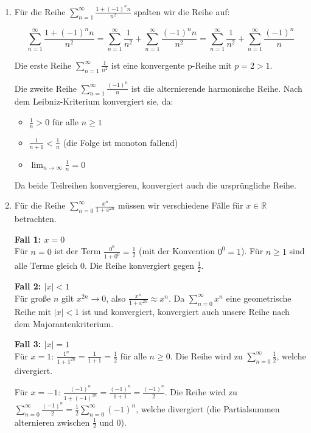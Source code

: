 \documentclass{article}
\begin{document}
\begin{enumerate}[label=(\alph*)]
\item Für die Reihe $\displaystyle \sum_{n=1}^\infty \frac{1 + (-1)^n n}{n^2}$ spalten wir die Reihe auf:

$$\sum_{n=1}^\infty \frac{1 + (-1)^n n}{n^2} = \sum_{n=1}^\infty \frac{1}{n^2} + \sum_{n=1}^\infty \frac{(-1)^n n}{n^2} = \sum_{n=1}^\infty \frac{1}{n^2} + \sum_{n=1}^\infty \frac{(-1)^n}{n}$$

Die erste Reihe $\sum_{n=1}^\infty \frac{1}{n^2}$ ist eine konvergente p-Reihe mit $p = 2 > 1$.

Die zweite Reihe $\sum_{n=1}^\infty \frac{(-1)^n}{n}$ ist die alternierende harmonische Reihe. Nach dem Leibniz-Kriterium konvergiert sie, da:
\begin{itemize}
\item $\frac{1}{n} > 0$ für alle $n \geq 1$
\item $\frac{1}{n+1} < \frac{1}{n}$ (die Folge ist monoton fallend)
\item $\lim_{n \to \infty} \frac{1}{n} = 0$
\end{itemize}

Da beide Teilreihen konvergieren, konvergiert auch die ursprüngliche Reihe.

\item Für die Reihe $\displaystyle \sum_{n=0}^\infty \frac{x^n}{1+x^{2n}}$ müssen wir verschiedene Fälle für $x \in \mathbb{R}$ betrachten.

\textbf{Fall 1: $x = 0$}\\
Für $n = 0$ ist der Term $\frac{0^0}{1+0^0} = \frac{1}{2}$ (mit der Konvention $0^0 = 1$).
Für $n \geq 1$ sind alle Terme gleich 0. Die Reihe konvergiert gegen $\frac{1}{2}$.

\textbf{Fall 2: $|x| < 1$}\\
Für große $n$ gilt $x^{2n} \to 0$, also $\frac{x^n}{1+x^{2n}} \approx x^n$. 
Da $\sum_{n=0}^\infty x^n$ eine geometrische Reihe mit $|x| < 1$ ist und konvergiert, konvergiert auch unsere Reihe nach dem Majorantenkriterium.

\textbf{Fall 3: $|x| = 1$}\\
Für $x = 1$: $\frac{1^n}{1+1^{2n}} = \frac{1}{1+1} = \frac{1}{2}$ für alle $n \geq 0$.
Die Reihe wird zu $\sum_{n=0}^\infty \frac{1}{2}$, welche divergiert.

Für $x = -1$: $\frac{(-1)^n}{1+(-1)^{2n}} = \frac{(-1)^n}{1+1} = \frac{(-1)^n}{2}$.
Die Reihe wird zu $\sum_{n=0}^\infty \frac{(-1)^n}{2} = \frac{1}{2} \sum_{n=0}^\infty (-1)^n$, welche divergiert (die Partialsummen alternieren zwischen $\frac{1}{2}$ und 0).


\end{enumerate}
\end{document}

